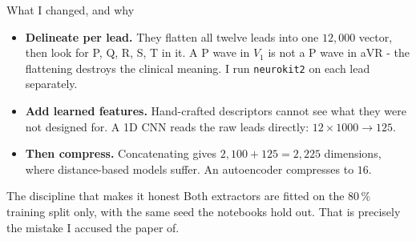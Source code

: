 \documentclass[xcolor=dvipsnames, aspectratio=169]{beamer}
\begin{document}
\begin{frame}{What I changed, and why}
    \begin{itemize}\setlength\itemsep{0.4em}
        \item \textbf{\textcolor{sagedeep}{Delineate per lead.}} They flatten all
              twelve leads into one $12{,}000$ vector, then look for P, Q, R, S, T
              in it. A P wave in $V_1$ is not a P wave in aVR - the flattening
              destroys the clinical meaning. I run \texttt{neurokit2}
              \alert{on each lead separately}.
        \item \textbf{\textcolor{sagedeep}{Add learned features.}} Hand-crafted
              descriptors cannot see what they were not designed for. A 1D CNN
              reads the raw leads directly: $12\times1000 \rightarrow 125$.
        \item \textbf{\textcolor{sagedeep}{Then compress.}} Concatenating gives
              $2{,}100 + 125 = 2{,}225$ dimensions, where distance-based models
              suffer. An autoencoder compresses to $16$.
    \end{itemize}

    \vspace{0.5em}
    \begin{block}{The discipline that makes it honest}
        Both extractors are fitted on the \alert{$80\,\%$ training split only},
        with the same seed the notebooks hold out. That is precisely the
        mistake I accused the paper of.
    \end{block}
\end{frame}
\end{document}
